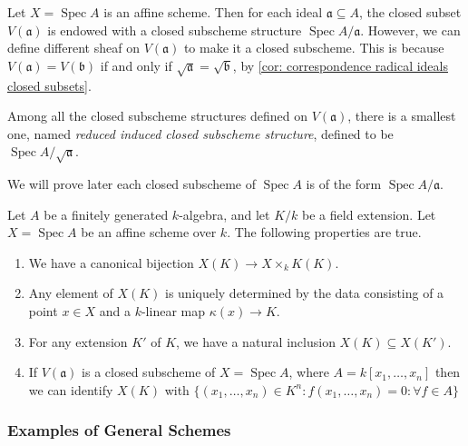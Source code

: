 \documentclass[11pt]{article}
\newcommand{\Spec}{\operatorname{Spec}}
\begin{document}
\begin{example}
    Let $ X = \Spec A $ is an affine scheme. Then for each ideal 
    $ \mathfrak{a} \subseteq A$, the closed subset $ V(\mathfrak{a}) $ is endowed with a closed 
    subscheme structure $ \Spec A / \mathfrak{a} $. 
    However, we can define different sheaf on $  V(\mathfrak{a}) $ to make it a closed subscheme. 
    This is because $ V(\mathfrak{a}) = V(\mathfrak{b}) $ if and only if $ \sqrt{\mathfrak{a}} = \sqrt{\mathfrak{b}} $, 
    by \autoref{cor: correspondence radical ideals closed subsets}. 
    
    Among all the closed subscheme structures defined on $ V(\mathfrak{a}) $, 
    there is a smallest one, named \emph{reduced induced closed subscheme structure}, 
    defined to be $ \Spec A / \sqrt{\mathfrak{a}} $. 

    We will prove later each closed subscheme of $ \Spec A $ is of the form 
    $ \Spec A / \mathfrak{a} $. 
\end{example}

\begin{example}
    \cite[Proposition 2.18]{Liuqing}
    Let $ A $ be a finitely generated $ k $-algebra, and let $ K / k $ be a field extension. 
    Let $ X = \Spec A $ be an affine scheme over $ k $.  
    The following properties are true. 
    \begin{enumerate}[label = \alph*]
        \item We have a canonical bijection $ X(K) \to  X \times_{k} K(K)$. 
        \item Any element of $ X(K) $ is uniquely determined by the data consisting of a point 
        $ x \in X $ and a $ k $-linear map $ \kappa(x) \to K$. 
        \item For any extension $ K' $ of $ K $, we have a natural inclusion $ X(K) \subseteq X(K') $. 
        \item If $ V(\mathfrak{a}) $ is a closed subscheme  of $ X=\Spec A $, where $ A =k[x_{1},\dots,x_{n}] $ 
         then we can identify $ X(K) $ 
        with $ \{(x_{1},\dots,x_{n}) \in K^{n} : f(x_{1},\dots,x_{n})=0: \forall f \in A\} $ 
    \end{enumerate}
\end{example}

\subsubsection{Examples of General Schemes}
\end{document}
